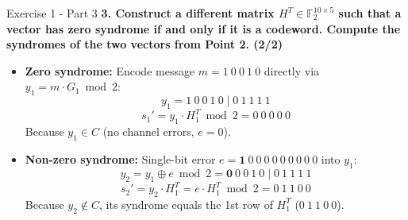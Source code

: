 \documentclass[10pt, aspectratio=169]{beamer}
\newcommand{\question}[1]{{\color{QuestionRed}\textbf{#1}}}
\begin{document}
\begin{frame}{Exercise 1 - Part 3}
  \question{3. Construct a different matrix $H^T \in \mathbb{F}_2^{10 \times 5}$ such that a vector has zero syndrome if and only if it is a codeword. Compute the syndromes of the two vectors from Point 2. (2/2)}

  \vspace{0.2cm}
  \begin{itemize}
    \item \textbf{Zero syndrome:}
    Encode message $m = 1\ 0\ 0\ 1\ 0$ directly via $y_1 = m \cdot G_1 \bmod 2$:
    \[
      y_1 = 1\ 0\ 0\ 1\ 0 \mid 0\ 1\ 1\ 1\ 1
    \]
    \[
      s_1' = y_1 \cdot H_1^T \bmod 2 = 0\ 0\ 0\ 0\ 0
    \]
    Because $y_1 \in C$ (no channel errors, $e = 0$).
    \item \textbf{Non-zero syndrome:}
    Single-bit error $e = \mathbf{1}\ 0\ 0\ 0\ 0\ 0\ 0\ 0\ 0\ 0$ into $y_1$:
    \[
      y_2 = y_1 \oplus e \bmod 2 = \mathbf{0}\ 0\ 0\ 1\ 0 \mid 0\ 1\ 1\ 1\ 1
    \]
    \[
      s_2' = y_2 \cdot H_1^T = e \cdot H_1^T \bmod 2 = 0\ 1\ 1\ 0\ 0
    \]
    Because $y_2 \notin C$, its syndrome equals the 1st row of $H_1^T$ ($0\ 1\ 1\ 0\ 0$).
  \end{itemize}
\end{frame}
\end{document}
